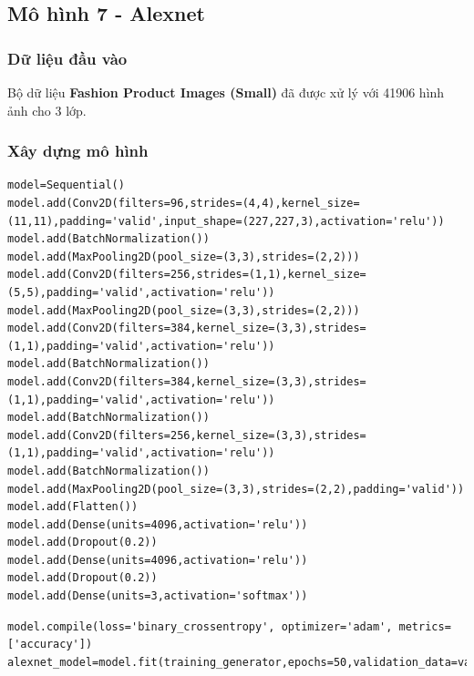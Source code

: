 \subsection{Mô hình 7 - Alexnet}
\subsubsection{Dữ liệu đầu vào}
Bộ dữ liệu \textbf{Fashion Product Images (Small)} đã được xử lý với 41906 hình ảnh cho 3 lớp.
\subsubsection{Xây dựng mô hình}
\begin{lstlisting}
model=Sequential()
model.add(Conv2D(filters=96,strides=(4,4),kernel_size=(11,11),padding='valid',input_shape=(227,227,3),activation='relu'))
model.add(BatchNormalization())
model.add(MaxPooling2D(pool_size=(3,3),strides=(2,2)))
model.add(Conv2D(filters=256,strides=(1,1),kernel_size=(5,5),padding='valid',activation='relu'))
model.add(MaxPooling2D(pool_size=(3,3),strides=(2,2)))
model.add(Conv2D(filters=384,kernel_size=(3,3),strides=(1,1),padding='valid',activation='relu'))
model.add(BatchNormalization())
model.add(Conv2D(filters=384,kernel_size=(3,3),strides=(1,1),padding='valid',activation='relu'))
model.add(BatchNormalization())
model.add(Conv2D(filters=256,kernel_size=(3,3),strides=(1,1),padding='valid',activation='relu'))
model.add(BatchNormalization())
model.add(MaxPooling2D(pool_size=(3,3),strides=(2,2),padding='valid'))
model.add(Flatten())
model.add(Dense(units=4096,activation='relu'))
model.add(Dropout(0.2))
model.add(Dense(units=4096,activation='relu'))
model.add(Dropout(0.2))
model.add(Dense(units=3,activation='softmax')) 
\end{lstlisting}

\begin{lstlisting}
model.compile(loss='binary_crossentropy', optimizer='adam', metrics=['accuracy']) 
alexnet_model=model.fit(training_generator,epochs=50,validation_data=validation_generator,steps_per_epoch=len(training_generator),validation_steps=len(validation_generator))
\end{lstlisting}

